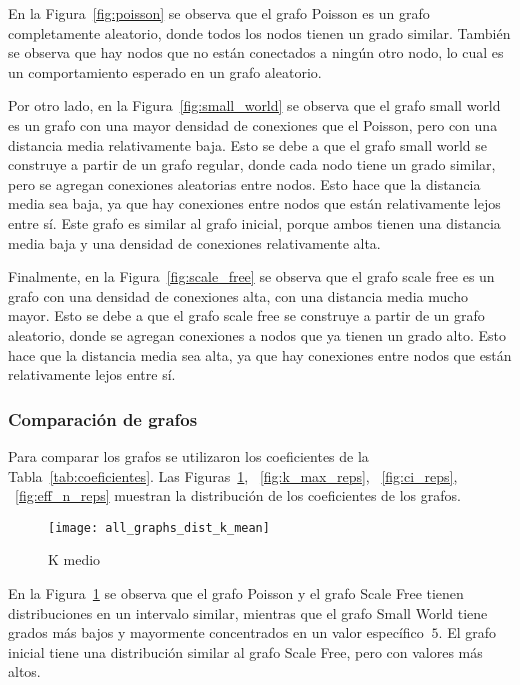\documentclass{article}
\begin{document}
En la Figura~\ref{fig:poisson} se observa que el grafo Poisson es un grafo completamente aleatorio, donde todos los nodos tienen un grado similar.
También se observa que hay nodos que no están conectados a ningún otro nodo, lo cual es un comportamiento esperado en un grafo aleatorio.

Por otro lado, en la Figura~\ref{fig:small_world} se observa que el grafo small world es un grafo con una mayor densidad de conexiones que el Poisson, pero con una distancia media relativamente baja.
Esto se debe a que el grafo small world se construye a partir de un grafo regular, donde cada nodo tiene un grado similar, pero se agregan conexiones aleatorias entre nodos.
Esto hace que la distancia media sea baja, ya que hay conexiones entre nodos que están relativamente lejos entre sí.
Este grafo es similar al grafo inicial, porque ambos tienen una distancia media baja y una densidad de conexiones relativamente alta.

Finalmente, en la Figura~\ref{fig:scale_free} se observa que el grafo scale free es un grafo con una densidad de conexiones alta, con una distancia media mucho mayor.
Esto se debe a que el grafo scale free se construye a partir de un grafo aleatorio, donde se agregan conexiones a nodos que ya tienen un grado alto.
Esto hace que la distancia media sea alta, ya que hay conexiones entre nodos que están relativamente lejos entre sí.

\subsubsection{Comparación de grafos}\label{subsubsec:comparacion-de-grafos}

Para comparar los grafos se utilizaron los coeficientes de la Tabla~\ref{tab:coeficientes}.
Las Figuras~\ref{fig:k_mean_reps}, ~\ref{fig:k_max_reps}, ~\ref{fig:ci_reps}, ~\ref{fig:eff_n_reps} muestran la distribución de los coeficientes de los grafos.

\begin{figure}[h!]
    \centering
    \texttt{[image: all\_graphs\_dist\_k\_mean]}
    \caption{K medio}
    \label{fig:k_mean_reps}
\end{figure}

En la Figura~\ref{fig:k_mean_reps} se observa que el grafo Poisson y el grafo Scale Free tienen distribuciones en un intervalo similar, mientras que el grafo Small World tiene grados más bajos y mayormente concentrados en un valor específico $~5$.
El grafo inicial tiene una distribución similar al grafo Scale Free, pero con valores más altos.
\end{document}
